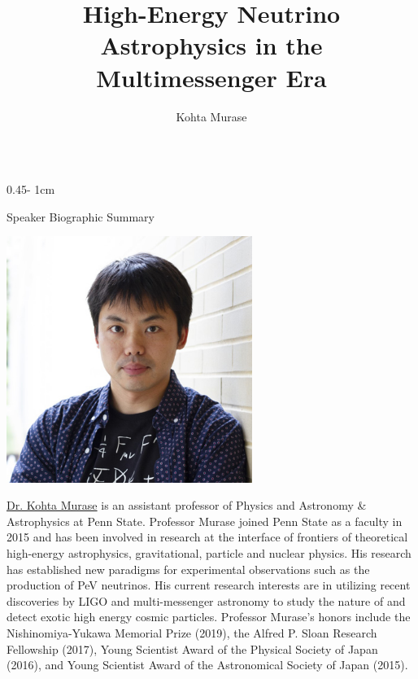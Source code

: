 \documentclass{../psuposter}
\title{High-Energy Neutrino Astrophysics in the Multimessenger Era}
\author{Kohta Murase}
\institute{Penn State University}
\begin{document}
\begin{frame}
\begin{columns}[t, totalwidth=\textwidth]
\begin{column}{0.45\textwidth - 1cm}


    \begin{block}{Speaker Biographic Summary}
    	\begin{center}
    		\includegraphics[width=0.6\textwidth]{images/murase}
    	\end{center}
    	\href{https://science.psu.edu/physics/people/kohta-murase}{Dr. Kohta Murase} is an assistant professor of Physics and Astronomy \& Astrophysics at Penn State. Professor Murase joined Penn State as a faculty in 2015 and has been involved in research at the interface of frontiers of theoretical high-energy astrophysics, gravitational, particle and nuclear physics. His research has established new paradigms for experimental observations such as the production of PeV neutrinos. His current research interests are in utilizing recent discoveries by LIGO and multi-messenger astronomy to study the nature of and detect exotic high energy cosmic particles. Professor Murase's honors include the Nishinomiya-Yukawa Memorial Prize (2019), the Alfred P. Sloan Research Fellowship (2017), Young Scientist Award of the Physical Society of Japan (2016), and Young Scientist Award of the Astronomical Society of Japan (2015).
    \end{block}



\end{column}
\end{columns}
\end{frame}
\end{document}
